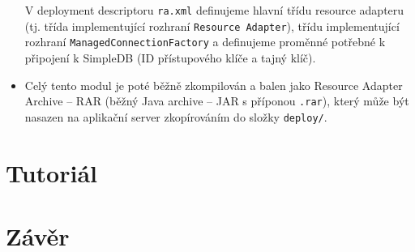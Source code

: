 \documentclass[oneside,11pt]{fithesis2}
\begin{document}
\begin{itemize}
 V deployment descriptoru \texttt{ra.xml} definujeme hlavní třídu resource adapteru (tj. třída implementující rozhraní \texttt{Resource Adapter}), třídu implementující rozhraní \texttt{ManagedConnectionFactory} a definujeme proměnné potřebné k připojení k SimpleDB (ID přístupového klíče a tajný klíč). 
 
 \item Celý tento modul je poté běžně zkompilován a balen jako Resource Adapter Archive -- RAR (běžný Java archive -- JAR s příponou \texttt{.rar}), který může být nasazen na aplikační server zkopírováním do složky \texttt{deploy/}. 

\end{itemize}


\chapter{Tutoriál}
\chapter{Závěr}
\end{document}

